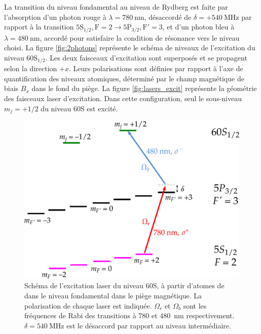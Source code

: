La transition du niveau fondamental au niveau de Rydberg est faite par l'absorption d'un photon rouge à $\lambda = \SI{780}{\nano\meter}$, désaccordé de $\delta=+\SI{540}{\MHz}$ par rapport à la transition $\mathrm{5S_{1/2},F=2 \rightarrow 5P_{3/2},F'=3}$, et d'un photon bleu à $\lambda = \SI{480}{\nano\meter}$, accordé pour satisfaire la condition de résonance vers le niveau choisi.
La figure \eqref{fig:2photons} représente le schéma de niveaux de l'excitation du niveau $\mathrm{60S_{1/2}}$.
Les deux faisceaux d'excitation sont superposés et se propagent selon la direction $+x$. Leurs polarisations sont définies par rapport à l'axe de quantification des niveaux atomiques, déterminé par le champ magnétique de biais $B_x$ dans le fond du piège.
La figure \eqref{fig:lasers_excit} représente la géométrie des faisceaux laser d'excitation.
Dans cette configuration, seul le sous-niveau $m_j=+1/2$ du niveau 60S est excité.
%
\begin{figure}[!h]
\centering
\includegraphics[width=.7\linewidth]{figures/setup/rydberg/2photons}
\caption[Excitation du niveau 60S]{Schéma de l'excitation laser du niveau 60S, à partir d'atomes de  dans le niveau fondamental dans le piège magnétique.
La polarisation de chaque laser est indiquée.
$\Omega_r$ et $\Omega_b$ sont les fréquences de Rabi des transitions à \num{780} et \SI{480}{\nano\meter} respectivement.
$\delta=\SI{540}{\MHz}$ est le désaccord par rapport au niveau intermédiaire.
}
\label{fig:2photons}
\end{figure}

